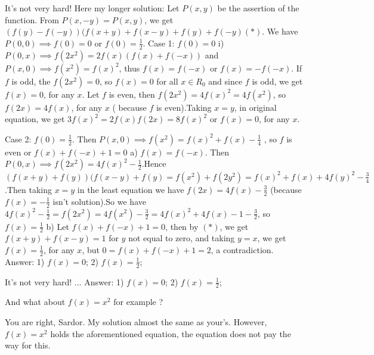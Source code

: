 \begin{solution}
	It's not very hard!
Here my longer solution:
Let $ P(x,y) $ be the assertion of the function.
From $ P(x,-y)=P(x,y) $, we get $ (f(y)-f(-y))(f(x+y)+f(x-y)+f(y)+f(-y) (*) $.
We have $ P(0,0)  \implies f(0)=0 $ or $ f(0)=\frac{1}{2} $.
Case 1: $ f(0)=0 $
i) $ P(0,x) \implies f(2x^2)=2f(x)(f(x)+f(-x)) $ and  
$ P(x,0) \implies f(x^2)=f(x)^2 $, thus $ f(x)=f(-x) $ or $ f(x)=-f(-x) $.
If $ f $ is odd, the $ f(2x^2)=0 $, so $ f(x)=0 $ for all $ x \in R_0 $ and since $ f $ is odd, we get $ f(x)=0 $, for any $ x $.
Let  $ f $ is even, then $ f(2x^2)=4f(x)^2=4f(x^2) $, so $ f(2x)=4f(x) $, for any $ x $ ( because $ f $ is even).Taking $ x=y $, in original equation, we get $ 3f(x)^2=2f(x)f(2x)=8f(x)^2 $ or $ f(x)=0 $, for any $ x $.

Case 2: $ f(0)=\frac{1}{2} $.
Then  $ P(x,0) \implies  f(x^2)=f(x)^2+f(x)-\frac{1}{4} $ , so $ f $ is even or $ f(x)+f(-x)+1=0 $
a) $ f(x)=f(-x) $. Then $ P(0,x) \implies f(2x^2)=4f(x)^2-\frac{1}{2} $.Hence
$ (f(x+y)+f(y))(f(x-y)+f(y)=f(x^2)+f(2y^2)=f(x)^2+f(x)+4f(y)^2-\frac{3}{4} $.Then taking $ x=y $ in the least equation  we have $ f(2x)=4f(x)-\frac{3}{2} $ (because $ f(x)=-\frac{1}{2} $ isn't solution).So we have $ 4f(x)^2-\frac{1}{2}=f(2x^2)=4f(x^2)-\frac{3}{2}=4f(x)^2+4f(x)-1-\frac{3}{2} $, so $ f(x)=\frac{1}{2} $
b) Let $ f(x)+f(-x)+1=0 $, then by $ (*) $, we get $ f(x+y)+f(x-y)=1 $ for $ y $ not equal to zero, and taking $ y=x $, we get $ f(x)=\frac{1}{2} $, for any $ x $, but $ 0=f(x)+f(-x)+1=2 $, a contradiction.
Answer:
1) $ f(x)=0 $;
2) $ f(x)=\frac{1}{2} $;
\end{solution}



\begin{solution}
	\begin{tcolorbox}It's not very hard!
...
Answer:
1) $ f(x)=0 $;
2) $ f(x)=\frac{1}{2} $;\end{tcolorbox}

And what about $f(x)=x^2$ for example ?
\end{solution}



\begin{solution}
	You are right, Sardor. My solution almost the same as your's. However, $ f(x)=x^2$ holds the aforementioned equation, the equation does not pay the way for this.
\end{solution}



